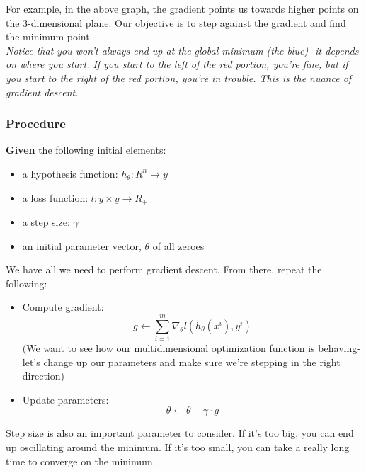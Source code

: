 \documentclass[english, 10pt]{article}
\begin{document}
For example, in the above graph, the gradient points us towards higher points on the 3-dimensional plane. Our objective is to step against the gradient and find the minimum point.\\

\textit{Notice that you won't always end up at the global minimum (the blue)- it depends on where you start. If you start to the left of the red portion, you're fine, but if you start to the right of the red portion, you're in trouble. This is the nuance of gradient descent.}\\

\subsubsection{Procedure}

\textbf{Given} the following initial elements:

\begin{myproof}

\begin{itemize}
	\item a hypothesis function: $h_{\theta}:R^n \rightarrow y$
	\item a loss function: $l:y \times y \rightarrow R_+$
	\item a step size: $\gamma$
	\item an initial parameter vector, $\theta$ of all zeroes
\end{itemize}
\end{myproof}

We have all we need to perform gradient descent. From there, repeat the following:

\begin{myproof}
\begin{itemize}
	\item Compute gradient: $$ g \leftarrow \sum_{i=1}^{m}{\nabla_{\theta} l(h_{\theta}(x^i), y^i)}$$
	(We want to see how our multidimensional optimization function is behaving- let's change up our parameters and make sure we're stepping in the right direction)
	\item Update parameters: $$ \theta \leftarrow \theta - \gamma \cdot g$$
\end{itemize}
\end{myproof}

Step size is also an important parameter to consider. If it's too big, you can end up oscillating around the minimum. If it's too small, you can take a really long time to converge on the minimum.
\end{document}

